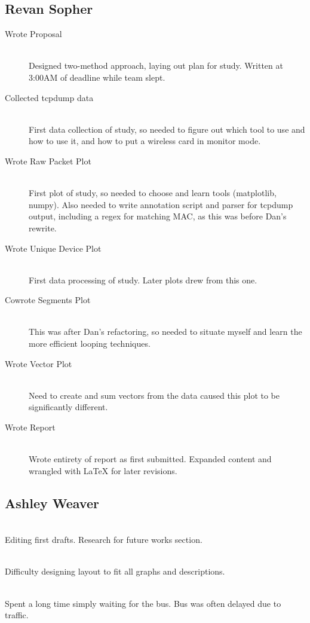\documentclass[12pt,journal,compsoc]{IEEEtran} %
\newcommand{\ditem}[2]{\item[#1] \hfill \\ #2}
\begin{document}
\subsection*{Revan Sopher}
\begin{description}
\item [Wrote Proposal] \hfill \\
	Designed two-method approach, laying out plan for study. Written at 3:00AM of deadline while team slept.
\item [Collected tcpdump data] \hfill \\
	First data collection of study, so needed to figure out which tool to use and how to use it, and how to put a wireless card in monitor mode.
\item [Wrote Raw Packet Plot] \hfill \\
	First plot of study, so needed to choose and learn tools (matplotlib, numpy). Also needed to write annotation script and parser for tcpdump output, including a regex for matching MAC, as this was before Dan's rewrite.
\item [Wrote Unique Device Plot] \hfill \\
	First data processing of study. Later plots drew from this one.
\item [Cowrote Segments Plot] \hfill \\
	This was after Dan's refactoring, so needed to situate myself and learn the more efficient looping techniques.
\item [Wrote Vector Plot] \hfill \\
	Need to create and sum vectors from the data caused this plot to be significantly different.
\item [Wrote Report] \hfill \\
	Wrote entirety of report as first submitted. Expanded content and wrangled with LaTeX for later revisions.
\end{description}

\subsection*{Ashley Weaver}
\begin{description}{}
\ditem{Cowrote report}{
	Editing first drafts.
	Research for future works section.
}
\ditem{Cowrote Poster}{
	Difficulty designing layout to fit all graphs and descriptions.
}
\ditem{Collected bus data}{
	Spent a long time simply waiting for the bus.
	Bus was often delayed due to traffic.
}
\end{description}
\end{document}
